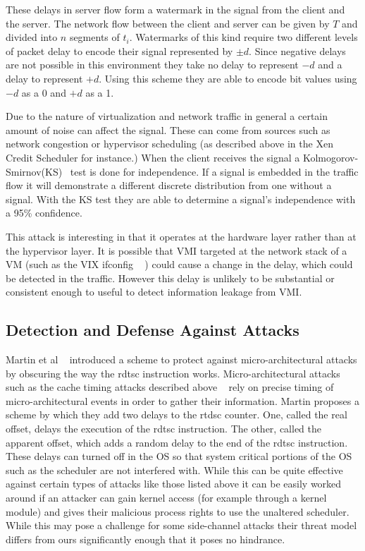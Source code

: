 These delays in server flow form a watermark in the signal from the client and the server. The network flow between the client and server can be given by $T$ and divided into $n$ segments of $t_i$. Watermarks of this kind require two different levels of packet delay to encode their signal represented by $\pm d$. Since negative delays are not possible in this environment they take no delay to represent $-d$ and a delay to represent $+d$. Using this scheme they are able to encode bit values using $-d$ as a 0 and $+d$ as a 1. 

Due to the nature of virtualization and network traffic in general a certain amount of noise can affect the signal. These can come from sources such as network congestion or hypervisor scheduling (as described above in the Xen Credit Scheduler for instance.) When the client receives the signal a Kolmogorov-Smirnov(KS)~\cite{pettitt_kolmogorov-smirnov_1977} test is done for independence. If a signal is embedded in the traffic flow it will demonstrate a different discrete distribution from one without a signal. With the KS test they are able to determine a signal's independence with a 95\% confidence. 

This attack is interesting in that it operates at the hardware layer rather than at the hypervisor layer. It is possible that VMI targeted at the network stack of a VM (such as the VIX ifconfig ~\cite{hay_forensics_2008} ) could cause a change in the delay, which could be detected in the traffic. However this delay is unlikely to be substantial or consistent enough to useful to detect information leakage from VMI.

\subsection{Detection and Defense Against Attacks}

Martin et al ~\cite{martin2012timewarp} introduced a scheme to protect against micro-architectural attacks by obscuring the way the rdtsc instruction works. Micro-architectural attacks such as the cache timing attacks described above ~\cite{zhang_cross-vm_2012,ristenpart_hey_2009,zhang_homealone:_2011} rely on precise timing of micro-architectural events in order to gather their information. Martin proposes a scheme by which they add two delays to the rtdsc counter. One, called the real offset, delays the execution of the rdtsc instruction. The other, called the apparent offset, which adds a random delay to the end of the rdtsc instruction. These delays can turned off in the OS so that system critical portions of the OS such as the scheduler are not interfered with.  While this can be quite effective against certain types of attacks like those listed above it can be easily worked around if an attacker can gain kernel access (for example through a kernel module) and gives their malicious process rights to use the unaltered scheduler. While this may pose a challenge for some side-channel attacks their threat model differs from ours significantly enough that it poses no hindrance.

